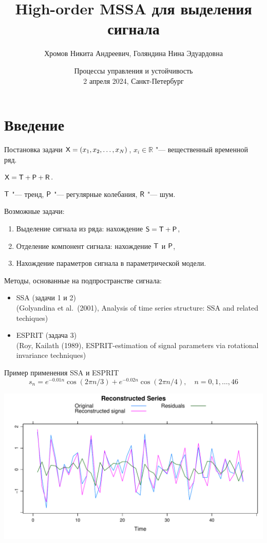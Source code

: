 \documentclass[ucs, notheorems, handout]{beamer}
\title[HO-MSSA]{High-order MSSA для выделения сигнала}
\author[Хромов Н.А., Голяндина Н.Э.]{Хромов Никита Андреевич, Голяндина Нина Эдуардовна}
\institute[Санкт-Петербургский Государственный Университет]{%
    \small
    Санкт-Петербургский государственный университет\\
    Кафедра статистического моделирования\\
    \vspace{1.6cm}
}
\date{Процессы управления и устойчивость\\
2 апреля 2024, Санкт-Петербург}
\newcommand{\bluetext}[1]{{\usebeamercolor[fg]{bluetext_color}#1}}
\begin{document}
    \begin{frame}[plain]
        \titlepage

    \end{frame}


    \section{Введение}\label{sec:introduction}
    \begin{frame}{Постановка задачи}
        $\mathsf{X}=(x_1, x_2,\ldots, x_N)$, $x_i\in \mathbb{R}$ "--- вещественный временной ряд.

        $\mathsf{X} = \mathsf{T} + \mathsf{P} + \mathsf{R}$.

        $\mathsf{T}$ "--- тренд, $\mathsf{P}$ "--- регулярные колебания, $\mathsf{R}$ "--- шум.
        \vspace{0.3cm}

        \bluetext{Возможные задачи:}
        \begin{enumerate}
            \item Выделение сигнала из ряда: нахождение $\mathsf{S} = \mathsf{T} + \mathsf{P}$,
            \item Отделение компонент сигнала: нахождение $\mathsf{T}$ и $\mathsf{P}$,
            \item Нахождение параметров сигнала в параметрической модели.
        \end{enumerate}

        \vspace{0.3cm}
        Методы, основанные на подпространстве сигнала:
        \begin{itemize}
            \item SSA (задачи 1 и 2)
            \\(Golyandina et al.\ (2001), Analysis of time series structure: SSA and related techiques)
            \item ESPRIT (задача 3)
            \\(Roy, Kailath (1989), ESPRIT-estimation of signal parameters via rotational invariance techniques)
        \end{itemize}
    \end{frame}

    \begin{frame}{Пример применения SSA и ESPRIT}
        \[
            s_n = e^{-0.01 n} \cos(2\pi n / 3) + e^{-0.02 n} \cos(2\pi n / 4), \quad n=0, 1, \ldots, 46
        \]

        \smallskip
        \center
        \includegraphics[width=\textwidth]{img/decomp}
    \end{frame}
\end{document}

